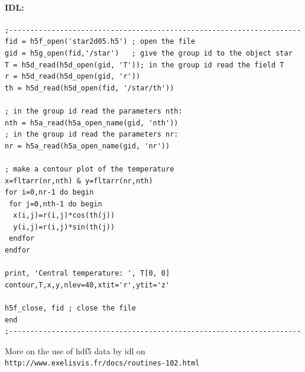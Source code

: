 \paragraph{IDL:}
\begin{verbatim}
;---------------------------------------------------------------------
fid = h5f_open('star2d05.h5') ; open the file
gid = h5g_open(fid,'/star')   ; give the group id to the object star
T = h5d_read(h5d_open(gid, 'T')); in the group id read the field T
r = h5d_read(h5d_open(gid, 'r'))
th = h5d_read(h5d_open(fid, '/star/th'))

; in the group id read the parameters nth:
nth = h5a_read(h5a_open_name(gid, 'nth'))
; in the group id read the parameters nr:
nr = h5a_read(h5a_open_name(gid, 'nr'))

; make a contour plot of the temperature
x=fltarr(nr,nth) & y=fltarr(nr,nth)
for i=0,nr-1 do begin
 for j=0,nth-1 do begin
  x(i,j)=r(i,j)*cos(th(j))
  y(i,j)=r(i,j)*sin(th(j))
 endfor
endfor

print, 'Central temperature: ', T[0, 0]
contour,T,x,y,nlev=40,xtit='r',ytit='z'

h5f_close, fid ; close the file
end
;---------------------------------------------------------------------
\end{verbatim}

More on the use of hdf5 data by idl on {\tt
http://www.exelisvis.fr/docs/routines-102.html}
